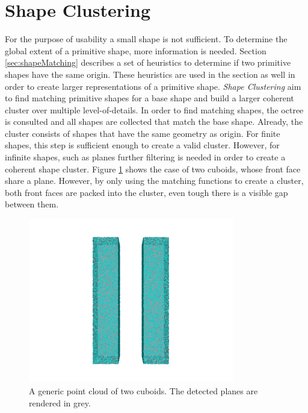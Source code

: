 \section{Shape Clustering}

For the purpose of usability a small shape is not sufficient. To determine the global extent of a primitive shape, more information is needed. Section \ref{sec:shapeMatching} describes a set of heuristics to determine if two primitive shapes have the same origin. These heuristics are used in the section as well in order to create larger representations of a primitive shape. 
\textit{Shape Clustering} aim to find matching primitive shapes for a base shape and build a larger coherent cluster over multiple level-of-details. 
In order to find matching shapes, the octree is consulted and all shapes are collected that match the base shape. Already, the cluster consists of shapes that have the same geometry as origin. For finite shapes, this step is sufficient enough to create a valid cluster. However, for infinite shapes, such as planes further filtering is needed in order to create a coherent shape cluster. Figure \ref{fig:cuboids} shows the case of two cuboids, whose front face share a plane. However, by only using the matching functions to create a cluster, both front faces are packed into the cluster, even tough there is a visible gap between them.

\begin{figure}
	\centering
	\includegraphics[width=0.8\textwidth]{Shape_Detection/cuboids.png}
	\caption{A generic point cloud of two cuboids. The detected planes are rendered in grey.}
	\label{fig:cuboids}
\end{figure}

